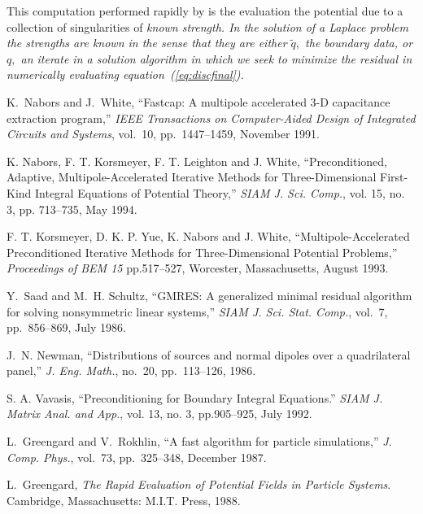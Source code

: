 This computation performed rapidly by \fas is 
the evaluation the potential due to a collection of singularities of 
\it known \rm strength.  In the
solution of a Laplace problem the strengths are known in the sense that they 
are either $\tilde q,$ the boundary data, or $q,$ an iterate in a solution 
algorithm in which we seek to minimize the residual in numerically 
evaluating equation~(\ref{eq:discfinal}).

\nocite{greeng88, newman}
\begin{thebibliography}{}

K.~Nabors and J.~White, ``Fastcap: A multipole accelerated {3-D} capacitance
  extraction program,'' {\em {IEEE} Transactions on Computer-Aided Design of
  Integrated Circuits and Systems}, vol.~10, pp.~1447--1459, November 1991.

K. Nabors, F. T. Korsmeyer, F. T. Leighton and J. White, ``Preconditioned, Adaptive, Multipole-Accelerated Iterative Methods for Three-Dimensional First-Kind Integral Equations of Potential Theory,''	 {\em {SIAM} J. Sci. Comp.}, vol. 15, no. 3, pp. 713--735, May 1994.

F. T. Korsmeyer, D. K. P. Yue, K. Nabors and J. White, ``Multipole-Accelerated Preconditioned Iterative Methods for Three-Dimensional Potential Problems,'' {\em Proceedings of BEM 15} pp.517--527, Worcester, Massachusetts, August 1993. 

Y.~Saad and M.~H. Schultz, ``{GMRES}: A generalized minimal residual algorithm
  for solving nonsymmetric linear systems,'' {\em {SIAM} J. Sci. Stat. Comp.}, 
  vol.~7, pp.~856--869, July 1986.

J.~N. Newman, ``Distributions of sources and normal dipoles over a
  quadrilateral panel,'' {\em J. Eng. Math.}, no.~20,
  pp.~113--126, 1986.

S. A. Vavasis, ``Preconditioning for Boundary Integral Equations.'' {\em {SIAM} J. Matrix Anal. and App.}, vol. 13, no. 3, pp.905--925, July 1992. 

L.~Greengard and V.~Rokhlin, ``A fast algorithm for particle simulations,''
  {\em J. Comp. Phys.}, vol.~73, pp.~325--348, December 1987.

L.~Greengard, {\em The Rapid Evaluation of Potential Fields in Particle
  Systems}.
\newblock Cambridge, Massachusetts: {M.I.T. Press}, 1988.

\end{thebibliography}







